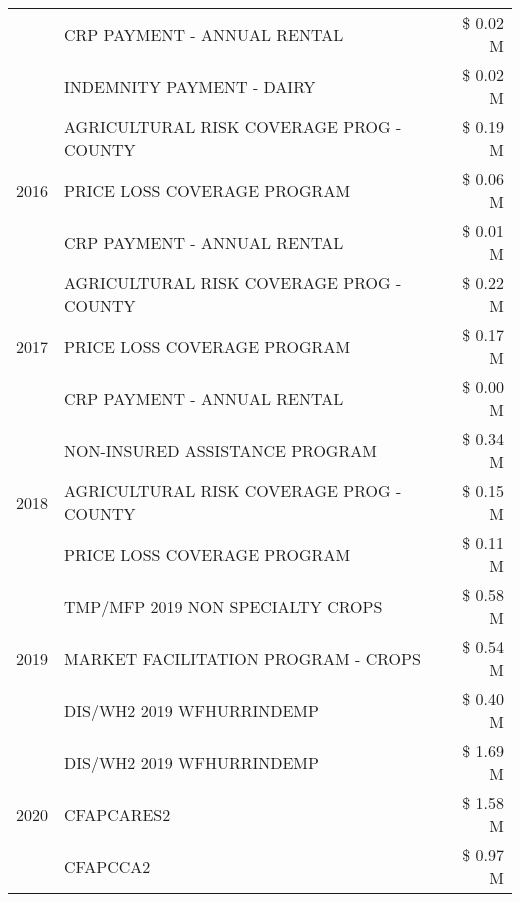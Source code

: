 \begin{tabular}{llr}
 & CRP PAYMENT - ANNUAL RENTAL & \$ 0.02 M \\
 & INDEMNITY PAYMENT - DAIRY & \$ 0.02 M \\
\cline{1-3}
\multirow[t]{3}{*}{2016} & AGRICULTURAL RISK COVERAGE PROG - COUNTY & \$ 0.19 M \\
 & PRICE LOSS COVERAGE PROGRAM & \$ 0.06 M \\
 & CRP PAYMENT - ANNUAL RENTAL & \$ 0.01 M \\
\cline{1-3}
\multirow[t]{3}{*}{2017} & AGRICULTURAL RISK COVERAGE PROG - COUNTY & \$ 0.22 M \\
 & PRICE LOSS COVERAGE PROGRAM & \$ 0.17 M \\
 & CRP PAYMENT - ANNUAL RENTAL & \$ 0.00 M \\
\cline{1-3}
\multirow[t]{3}{*}{2018} & NON-INSURED ASSISTANCE PROGRAM & \$ 0.34 M \\
 & AGRICULTURAL RISK COVERAGE PROG - COUNTY & \$ 0.15 M \\
 & PRICE LOSS COVERAGE PROGRAM & \$ 0.11 M \\
\cline{1-3}
\multirow[t]{3}{*}{2019} & TMP/MFP 2019 NON SPECIALTY CROPS & \$ 0.58 M \\
 & MARKET FACILITATION PROGRAM - CROPS & \$ 0.54 M \\
 & DIS/WH2 2019 WFHURRINDEMP & \$ 0.40 M \\
\cline{1-3}
\multirow[t]{3}{*}{2020} & DIS/WH2 2019 WFHURRINDEMP & \$ 1.69 M \\
 & CFAPCARES2 & \$ 1.58 M \\
 & CFAPCCA2 & \$ 0.97 M \\
\cline{1-3}
\bottomrule
\end{tabular}
